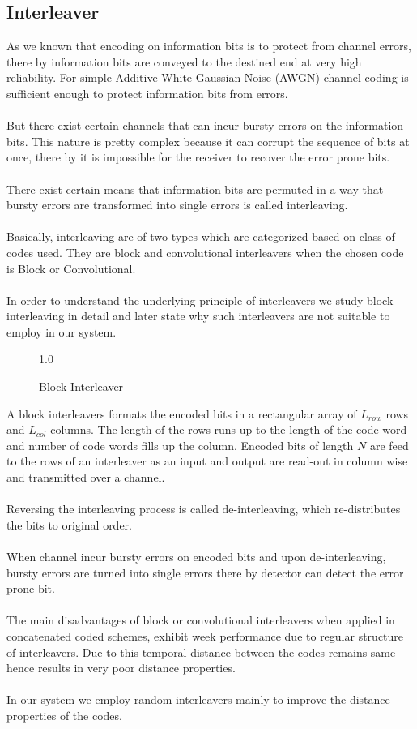 \subsection{Interleaver}
As we known that encoding on information bits is to protect from channel errors, there by information bits are conveyed to the destined end at very high reliability. For simple Additive White Gaussian Noise (AWGN) channel coding is sufficient enough to protect information bits from errors. \\ \\
But there exist certain channels that can incur bursty errors on the information bits. This nature is pretty complex because it can corrupt the sequence of bits at once, there by it is impossible for the receiver to recover the error prone bits. \\ \\
There exist certain means that information bits are permuted in a way that bursty errors are transformed into single errors is called interleaving. \\ \\
Basically, interleaving are of two types which are categorized based on class of codes used. They are block and convolutional interleavers when the chosen code is Block or Convolutional. \\ \\
In order to understand the underlying principle of interleavers we study block interleaving in detail and later state why such interleavers are not suitable to employ in our system.
\begin{figure}[htb]
\centerline{  {1.0} }
\caption{Block Interleaver}
\end{figure}
A block interleavers formats the encoded bits in a rectangular array of $L_{row}$ rows and $L_{col}$ columns. The length of the rows runs up to the length of the code word and number of code words fills up the column. Encoded bits of length $N$ are feed to the rows of an interleaver as an input and output are read-out in column wise and transmitted over a channel. \\ \\
Reversing the interleaving process is called de-interleaving, which re-distributes the bits to original order. \\ \\
When channel incur bursty errors on encoded bits and upon de-interleaving, bursty errors are turned into single errors there by detector can detect the error prone bit. \\ \\
The main disadvantages of block or convolutional interleavers when applied in concatenated coded schemes, exhibit week performance due to regular structure of interleavers. Due to this temporal distance between the codes remains same hence results in very poor distance properties. \\ \\
In our system we employ random interleavers mainly to improve the distance properties of the codes.
